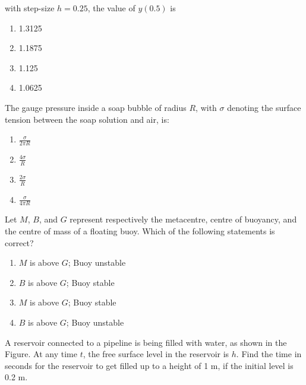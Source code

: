     with step-size \( h = 0.25 \), the value of \( y(0.5) \) is
    \begin{multicols}{4}
    \begin{enumerate}
        \item 1.3125
        \item 1.1875
        \item 1.125
        \item 1.0625
    \end{enumerate}
    \end{multicols}
\bigskip    
    \item The gauge pressure inside a soap bubble of radius $R$, with $\sigma$ denoting the surface tension between the soap solution and air, is:
    \begin{multicols}{4}
    \begin{enumerate}
        \item $\frac{\sigma}{2 \pi R}$
        \item $\frac{4 \sigma}{R}$
        \item $\frac{2 \sigma}{R}$
        \item $\frac{\sigma}{4 \pi R}$
    \end{enumerate}
    \end{multicols}
\bigskip
    \item Let $M$, $B$, and $G$ represent respectively the metacentre, centre of buoyancy, and the centre of mass of a floating buoy. Which of the following statements is correct?
    \begin{multicols}{2}
    \begin{enumerate}
        \item $M$ is above $G$; Buoy unstable
        \item $B$ is above $G$; Buoy stable
        \item $M$ is above $G$; Buoy stable
        \item $B$ is above $G$; Buoy unstable
    \end{enumerate}
    \end{multicols}
\bigskip
    \item A reservoir connected to a pipeline is being filled with water, as shown in the Figure. At any time $t$, the free surface level in the reservoir is $h$. Find the time in seconds for the reservoir to get filled up to a height of 1 m, if the initial level is 0.2 m.
